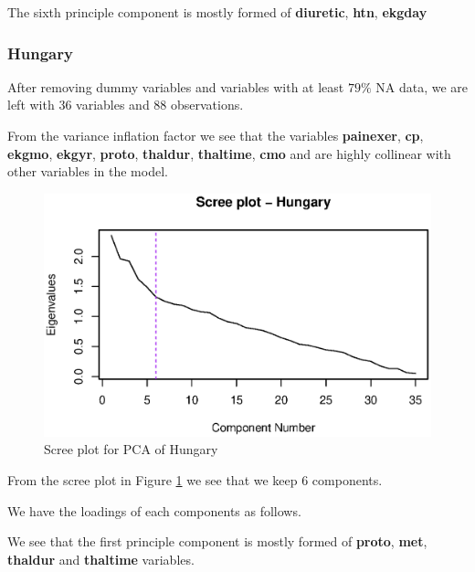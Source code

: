\documentclass[a4paper]{article}
\begin{document}
The sixth principle component is mostly formed of \textbf{diuretic}, \textbf{htn}, \textbf{ekgday}

\subsubsection{Hungary}

After removing dummy variables and variables with at least $79\%$ NA data, we are left with 36 variables and 88 observations. 



From the variance inflation factor we see that the variables \textbf{painexer}, \textbf{cp}, \textbf{ekgmo}, \textbf{ekgyr}, \textbf{proto}, \textbf{thaldur}, \textbf{thaltime}, \textbf{cmo} and  are highly collinear with other variables in the model.

\begin{figure}[H]
	\begin{center}
		\includegraphics[width=12cm]{question3output/hunscreeplot.eps}
	\end{center}
	\caption{Scree plot for PCA of Hungary}
	\label{q3-hun-screeplot}
\end{figure}

From the scree plot in Figure \ref{q3-hun-screeplot} we see that we keep 6 components.

We have the loadings of each components as follows.



We see that the first principle component is mostly formed of \textbf{proto}, \textbf{met}, \textbf{thaldur} and \textbf{thaltime} variables.
\end{document}
